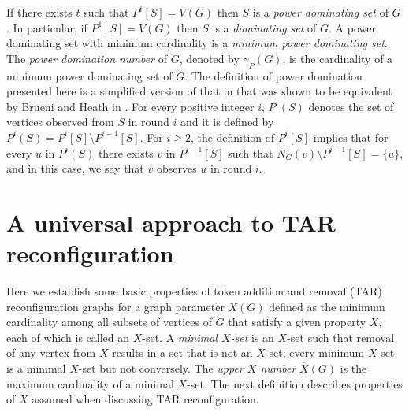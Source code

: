 \documentclass{article}
\numberwithin{figure}{section}   %
\theoremstyle{definition}
\theoremstyle{definition}
\theoremstyle{definition}
\newcommand{\ol}{\overline}
\newcommand{\pd}{\gamma_P}
\newcommand{\ppt}{\operatorname{ppt}}
\newcommand{\xbar}{\ol X}
\begin{document}
If there exists $t$ such that $P^{t}[S]= V(G)$ then $S$ is a \emph{power dominating set} of $G$. 
In particular, if $P^{1}[S]= V(G)$ then $S$ is a \emph{dominating set} of $G$.  A power dominating set with minimum cardinality is a \emph{minimum power dominating set}. %
The \emph{power domination number} of $G$, denoted by $\pd(G)$, is the cardinality of a minimum power dominating set of $G$. 
The definition of power domination presented here is a simplified version of that in \cite{HHHH02} that was shown to be equivalent by Brueni and Heath in \cite{BH}.
For every positive integer $i$, $P^i(S)$ denotes the set of vertices observed from $S$ in round $i$ and it is defined by $P^i(S)=P^i[S]\setminus P^{i-1}[S]$. For $i\geq 2$, the definition of $P^i[S]$ implies that for every $u$ in $P^i(S)$ there exists $v$ in $P^{i-1}[S]$ such that $N_G(v)\setminus P^{i-1}[S] =\{u\}$, and in this case, we say that $v$ observes $u$ in round $i$. 





\section{A universal approach to TAR reconfiguration}\label{s:universal}



 Here we establish some basic properties of token addition and removal (TAR) reconfiguration graphs  for  a graph parameter $X(G)$ defined as the minimum cardinality among all subsets of vertices of $G$ that satisfy a given property $X$, each of which is called an $X$-set.
A {\em minimal $X$-set} is an $X$-set such that removal of any vertex from $X$ results in a set that is not an $X$-set; every minimum $X$-set is a minimal $X$-set but not conversely. The {\em upper $X$ number} $\xbar(G)$ is the maximum cardinality of a {minimal} $X$-set. The next definition describes properties of $X$ assumed when discussing TAR reconfiguration.
\end{document}
